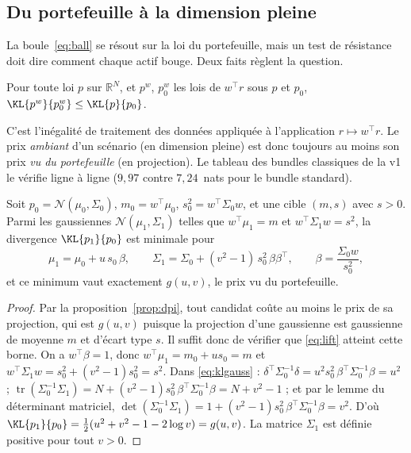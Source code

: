 \subsection{Du portefeuille à la dimension pleine}

La boule~\eqref{eq:ball} se résout sur la loi du portefeuille, mais un test de
résistance doit dire comment chaque actif bouge. Deux faits règlent la
question.

\begin{proposition}
\label{prop:dpi}
Pour toute loi $p$ sur $\mathbb R^N$, et $p^w$, $p_0^w$ les lois de $w^\top r$
sous $p$ et $p_0$,
$\KL{p^w}{p_0^w}\le\KL{p}{p_0}$.
\end{proposition}

C'est l'inégalité de traitement des données \citep{cover2006} appliquée à
l'application $r\mapsto w^\top r$. Le prix \emph{ambiant} d'un scénario (en
dimension pleine) est donc toujours au moins son prix \emph{vu du portefeuille}
(en projection). Le tableau des bundles classiques de la v1 le vérifie ligne à
ligne ($9{,}97$ contre $7{,}24$~nats pour le bundle standard).

\begin{proposition}
\label{prop:lift}
Soit $p_0=\mathcal N(\mu_0,\Sigma_0)$, $m_0=w^\top\mu_0$, $s_0^2=w^\top\Sigma_0w$,
et une cible $(m,s)$ avec $s>0$. Parmi les gaussiennes
$\mathcal N(\mu_1,\Sigma_1)$ telles que $w^\top\mu_1=m$ et
$w^\top\Sigma_1w=s^2$, la divergence $\KL{p_1}{p_0}$ est minimale pour
\begin{equation}
\label{eq:lift}
\mu_1=\mu_0+u\,s_0\,\beta,\qquad
\Sigma_1=\Sigma_0+(v^2-1)\,s_0^2\,\beta\beta^\top,
\qquad\beta=\frac{\Sigma_0w}{s_0^2},
\end{equation}
et ce minimum vaut exactement $g(u,v)$, le prix vu du portefeuille.
\end{proposition}

\begin{proof}
Par la proposition~\ref{prop:dpi}, tout candidat coûte au moins le prix de sa
projection, qui est $g(u,v)$ puisque la projection d'une gaussienne est
gaussienne de moyenne $m$ et d'écart type $s$. Il suffit donc de vérifier que
\eqref{eq:lift} atteint cette borne. On a $w^\top\beta=1$, donc
$w^\top\mu_1=m_0+us_0=m$ et $w^\top\Sigma_1w=s_0^2+(v^2-1)s_0^2=s^2$. Dans
\eqref{eq:klgauss} : $\delta^\top\Sigma_0^{-1}\delta=u^2s_0^2\,\beta^\top\Sigma_0^{-1}\beta=u^2$ ;
$\operatorname{tr}(\Sigma_0^{-1}\Sigma_1)=N+(v^2-1)s_0^2\,\beta^\top\Sigma_0^{-1}\beta=N+v^2-1$ ;
et par le lemme du déterminant matriciel,
$\det(\Sigma_0^{-1}\Sigma_1)=1+(v^2-1)s_0^2\,\beta^\top\Sigma_0^{-1}\beta=v^2$.
D'où $\KL{p_1}{p_0}=\tfrac12(u^2+v^2-1-2\log v)=g(u,v)$. La matrice $\Sigma_1$ est
définie positive pour tout $v>0$.
\end{proof}


